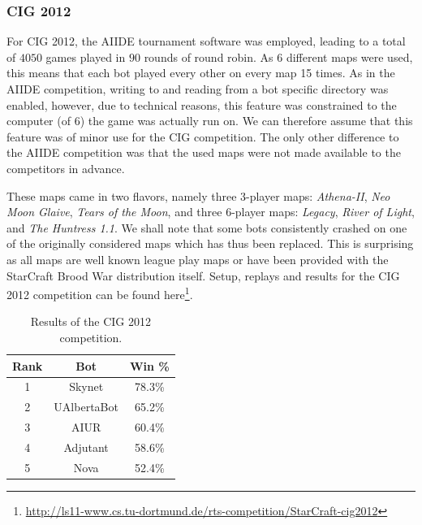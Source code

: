 \documentclass{llncs}
\begin{document}
\subsubsection{CIG 2012}

For CIG 2012, the AIIDE tournament software was employed,
leading to a total of $4050$ games played in $90$ rounds
of round robin. As 6 different maps were used, this means
that each bot played every other on every map 15 times. 
As in the AIIDE competition, writing to and reading from
a bot specific directory was enabled, however, due to 
technical reasons, this feature was constrained to the
computer (of 6) the game was actually run on. We can 
therefore assume that this feature was of minor use for
the CIG competition. The only other difference to the
AIIDE competition was that the used maps were not 
made available to the competitors in advance. 

These maps came in two flavors, namely three 3-player maps:
\emph{Athena-II}, \emph{Neo Moon Glaive}, \emph{Tears of the Moon},
and three 6-player maps:
\emph{Legacy}, \emph{River of Light}, and 
\emph{The Huntress 1.1}. 
We shall note that some bots consistently crashed on one
of the originally considered maps which has thus been replaced.
This is surprising as all maps are well known league play maps
or have been provided with the StarCraft Brood War distribution
itself.
Setup, replays and results for the CIG 2012 competition can be found
here\footnote{\url{http://ls11-www.cs.tu-dortmund.de/rts-competition/StarCraft-cig2012}}.

\begin{table}[t]
\caption{Results of the CIG 2012 competition.}
\label{tab:cig2012}
\centering
\begin{tabular}{|c|c|c|}
\hline
{\bfseries Rank} & {\bfseries Bot} & {\bfseries Win \%} \\
\hline
1 & Skynet & 78.3\% \\
2 & UAlbertaBot & 65.2\% \\
3 & AIUR & 60.4\% \\
4 & Adjutant & 58.6\% \\
5 & Nova & 52.4\% \\ 
\hline
\end{tabular}
\end{table}

\end{document}
